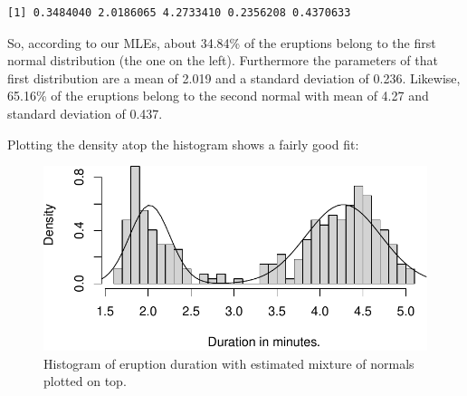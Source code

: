 \documentclass[
  letterpaper,
  DIV=11,
  numbers=noendperiod]{scrreprt}
\newenvironment{Shaded}{\begin{snugshade}}{\end{snugshade}}
\newcommand{\AttributeTok}[1]{\textcolor[rgb]{0.40,0.45,0.13}{#1}}
\newcommand{\CommentTok}[1]{\textcolor[rgb]{0.37,0.37,0.37}{#1}}
\newcommand{\ControlFlowTok}[1]{\textcolor[rgb]{0.00,0.23,0.31}{#1}}
\newcommand{\DecValTok}[1]{\textcolor[rgb]{0.68,0.00,0.00}{#1}}
\newcommand{\FunctionTok}[1]{\textcolor[rgb]{0.28,0.35,0.67}{#1}}
\newcommand{\NormalTok}[1]{\textcolor[rgb]{0.00,0.23,0.31}{#1}}
\newcommand{\OtherTok}[1]{\textcolor[rgb]{0.00,0.23,0.31}{#1}}
\newcommand{\SpecialCharTok}[1]{\textcolor[rgb]{0.37,0.37,0.37}{#1}}
\newcommand{\StringTok}[1]{\textcolor[rgb]{0.13,0.47,0.30}{#1}}
\begin{document}
\begin{verbatim}
[1] 0.3484040 2.0186065 4.2733410 0.2356208 0.4370633
\end{verbatim}

So, according to our MLEs, about 34.84\% of the eruptions belong to the
first normal distribution (the one on the left). Furthermore the
parameters of that first distribution are a mean of 2.019 and a standard
deviation of 0.236. Likewise, 65.16\% of the eruptions belong to the
second normal with mean of 4.27 and standard deviation of 0.437.

Plotting the density atop the histogram shows a fairly good fit:

\begin{Shaded}
\end{Shaded}

\begin{figure}[H]

{\centering \includegraphics{17-Estimation-Methods_files/figure-pdf/hist172-fig-1.pdf}

}

\caption{Histogram of eruption duration with estimated mixture of
normals plotted on top.}

\end{figure}%
\end{document}
